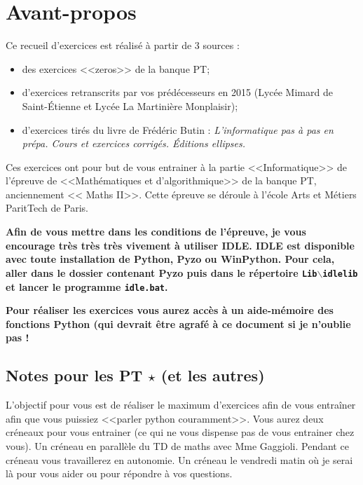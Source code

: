 \documentclass[10pt,fleqn]{article} %
\begin{document}


\def\columnseprulecolor{\color{ocre}}
\setlength{\columnseprule}{0.4pt} 

\section{Avant-propos}
Ce recueil d'exercices est réalisé à partir de 3 sources : 
\begin{itemize}
\item des exercices <<zeros>> de la banque PT; 
\item d'exercices retranscrits par vos prédécesseurs en 2015 (Lycée Mimard de Saint-Étienne et Lycée La Martinière Monplaisir);
\item d'exercices tirés du livre de Frédéric Butin : \textit{L'informatique pas à pas en prépa. Cours et exercices corrigés. Éditions ellipses.}
\end{itemize}

Ces exercices ont pour but de vous entrainer à la partie <<Informatique>> de l'épreuve de <<Mathématiques et d'algorithmique>> de la banque PT, anciennement << Maths II>>. Cette épreuve se déroule à l'école Arts et Métiers ParitTech de Paris.


\begin{warn}
\large{\textbf{
Afin de vous mettre dans les conditions de l'épreuve, je vous encourage très très très vivement à utiliser IDLE. IDLE est disponible avec toute installation de Python, Pyzo ou WinPython. 
Pour cela, aller dans le dossier contenant Pyzo puis dans le répertoire \texttt{Lib$\backslash$idlelib} et lancer le programme \texttt{idle.bat}.}

\textbf{Pour réaliser les exercices vous aurez accès à un aide-mémoire des fonctions Python  (qui devrait être agrafé à ce document si je n'oublie pas !}}
\end{warn}

\subsection*{Notes pour les PT $\star$ (et les autres)}

L'objectif pour vous est de réaliser le maximum d'exercices afin de vous entraîner afin que vous puissiez <<parler python couramment>>.  Vous aurez deux créneaux pour vous entrainer (ce qui ne vous dispense pas de vous entrainer chez vous). Un créneau en parallèle du TD de maths avec Mme Gaggioli. Pendant ce créneau vous travaillerez en autonomie. Un créneau le vendredi matin où je serai là pour vous aider ou pour répondre à vos questions. 
\end{document}
